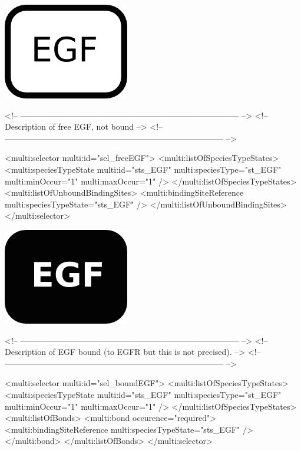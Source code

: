 \includegraphics{figs/pngs/sel_freeEGF.png}

\begin{example}
<!-- -------------------------------------------------------------------------------- -->
<!-- Description of free EGF, not bound                                               -->
<!-- -------------------------------------------------------------------------------- -->

      <multi:selector multi:id="sel_freeEGF">
        <multi:listOfSpeciesTypeStates>
          <multi:speciesTypeState multi:id="sts_EGF" multi:speciesType="st_EGF" 
                                  multi:minOccur="1" multi:maxOccur="1" />
        </multi:listOfSpeciesTypeStates>
        <multi:listOfUnboundBindingSites>
          <multi:bindingSiteReference multi:speciesTypeState="sts_EGF" />
        </multi:listOfUnboundBindingSites>
      </multi:selector>
\end{example}

\includegraphics{figs/pngs/sel_boundEGF.png}

\begin{example}
<!-- -------------------------------------------------------------------------------- -->
<!-- Description of EGF bound (to EGFR but this is not precised).                     -->
<!-- -------------------------------------------------------------------------------- -->

      <multi:selector multi:id="sel_boundEGF">
        <multi:listOfSpeciesTypeStates>
          <multi:speciesTypeState multi:id="sts_EGF" multi:speciesType="st_EGF" 
                                   multi:minOccur="1" multi:maxOccur="1" />
        </multi:listOfSpeciesTypeStates>
        <multi:listOfBonds>
          <multi:bond occurence="required">
            <multi:bindingSiteReference multi:speciesTypeState="sts_EGF" />
          </multi:bond>
        </multi:listOfBonds>
      </multi:selector>
\end{example}

